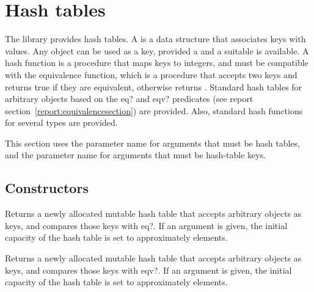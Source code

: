 \chapter{Hash tables}
\label{hashtablechapter}

The  library provides hash tables.
A  is a data structure that associates keys with values.
Any object can be used as a key, provided a 
and a suitable  is available.  A hash function is a
procedure that maps
keys to integers, and must be compatible with the equivalence function,
which is a procedure that accepts two keys and returns true if they
are equivalent, otherwise returns \schfalse{}.
Standard hash tables for arbitrary objects based on the {\cf eq?} and 
{\cf eqv?} predicates (see report section~\ref{report:equivalencesection}) are provided.  
Also, standard hash functions for several types are provided.

This section uses the  parameter name for arguments
that must be hash tables, and the  parameter name for
arguments that must be hash-table keys.

\section{Constructors}


\begin{entry}{%
}

Returns a newly allocated mutable hash table that accepts
arbitrary objects as keys,
and compares those keys with {\cf eq?}. If an argument is given, the initial 
capacity of the hash table is set to approximately  elements.

\end{entry}

\begin{entry}{%
}

Returns a newly allocated mutable hash table that accepts
arbitrary objects as keys,
and compares those keys with {\cf eqv?}.
If an argument is given, the initial 
capacity of the hash table is set to approximately  elements.

\end{entry}

